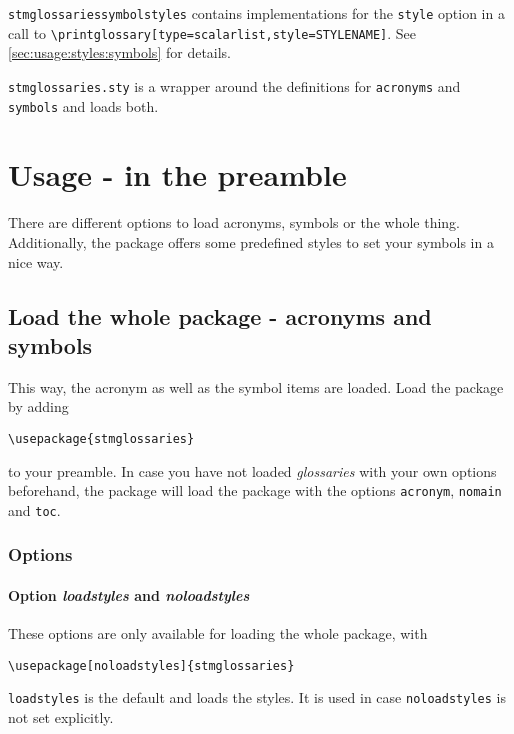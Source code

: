\documentclass{scrartcl}
\begin{document}
\texttt{stmglossariessymbolstyles} contains implementations for the \texttt{style} option in a call to \verb+\printglossary[type=scalarlist,style=STYLENAME]+. See \autoref{sec:usage:styles:symbols} for details.

\texttt{stmglossaries.sty} is a wrapper around the definitions for \texttt{acronyms} and \texttt{symbols} and loads both.

\section{Usage - in the preamble}
\label{sec:usage:preamble}

There are different options to load acronyms, symbols or the whole thing. Additionally, the package offers some predefined styles to set your symbols in a nice way.

\subsection{Load the whole package - acronyms and symbols}
\label{sec:usage:preamble:wholepackage}

This way, the acronym as well as the symbol items are loaded. Load the package by adding

\begin{verbatim}
\usepackage{stmglossaries}
\end{verbatim}

to your preamble. In case you have not loaded \textit{glossaries} with your own options beforehand, the package will load the package with the options \texttt{acronym}, \texttt{nomain} and \texttt{toc}.

\subsubsection{Options}

\paragraph{Option \protect\textit{loadstyles} and \protect\textit{noloadstyles}}

These options are only available for loading the whole package, with

\begin{verbatim}
\usepackage[noloadstyles]{stmglossaries}
\end{verbatim}

\texttt{loadstyles} is the default and loads the styles. It is used in case \texttt{noloadstyles} is not set explicitly.
\end{document}

